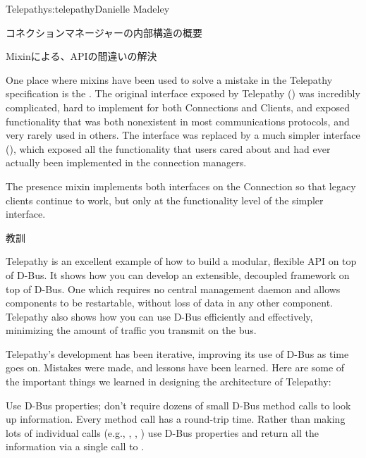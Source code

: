 \begin{aosachapter}{Telepathy}{s:telepathy}{Danielle Madeley}
\begin{aosasect1}{コネクションマネージャーの内部構造の概要}

\begin{aosabox}{Mixinによる、APIの間違いの解決}

One place where mixins have been used to solve a mistake in the
Telepathy specification is the .  The original
interface exposed by Telepathy
() was incredibly
complicated, hard to implement for both Connections and Clients, and
exposed functionality that was both nonexistent in most communications
protocols, and very rarely used in others. The interface was replaced
by a much simpler interface
(), which exposed all
the functionality that users cared about and had ever actually been
implemented in the connection managers.

The presence mixin implements both interfaces on the Connection so
that legacy clients continue to work, but only at the functionality
level of the simpler interface.

\end{aosabox}

\end{aosasect1}

\begin{aosasect1}{教訓}

Telepathy is an excellent example of how to build a modular, flexible
API on top of D-Bus. It shows how you can develop an extensible,
decoupled framework on top of D-Bus. One which requires no central
management daemon and allows components to be restartable, without
loss of data in any other component.  Telepathy also shows how you can
use D-Bus efficiently and effectively, minimizing the amount of
traffic you transmit on the bus.

Telepathy's development has been iterative, improving its use of D-Bus
as time goes on. Mistakes were made, and lessons have been learned.
Here are some of the important things we learned in designing the
architecture of Telepathy:

\begin{aosadescription}

  \item{Use D-Bus properties; don't require dozens of small D-Bus
    method calls to look up information.}  Every method call has a
    round-trip time. Rather than making lots of individual calls
    (e.g., , ,
    ) use D-Bus properties and return all the
    information via a single call to .


\end{aosadescription}
\end{aosasect1}
\end{aosachapter}
